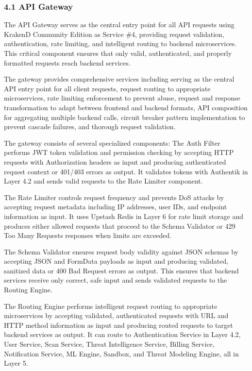\documentclass[12pt,a4paper]{report}
\begin{document}
\subsubsection{4.1 API Gateway}

The API Gateway serves as the central entry point for all API requests using KrakenD Community Edition as Service \#4, providing request validation, authentication, rate limiting, and intelligent routing to backend microservices. This critical component ensures that only valid, authenticated, and properly formatted requests reach backend services.

The gateway provides comprehensive services including serving as the central API entry point for all client requests, request routing to appropriate microservices, rate limiting enforcement to prevent abuse, request and response transformation to adapt between frontend and backend formats, API composition for aggregating multiple backend calls, circuit breaker pattern implementation to prevent cascade failures, and thorough request validation.

The gateway consists of several specialized components: The Auth Filter performs JWT token validation and permission checking by accepting HTTP requests with Authorization headers as input and producing authenticated request context or 401/403 errors as output. It validates tokens with Authentik in Layer 4.2 and sends valid requests to the Rate Limiter component.

The Rate Limiter controls request frequency and prevents DoS attacks by accepting request metadata including IP addresses, user IDs, and endpoint information as input. It uses Upstash Redis in Layer 6 for rate limit storage and produces either allowed requests that proceed to the Schema Validator or 429 Too Many Requests responses when limits are exceeded.

The Schema Validator ensures request body validity against JSON schemas by accepting JSON and FormData payloads as input and producing validated, sanitized data or 400 Bad Request errors as output. This ensures that backend services receive only correct, safe input and sends validated requests to the Routing Engine.

The Routing Engine performs intelligent request routing to appropriate microservices by accepting validated, authenticated requests with URL and HTTP method information as input and producing routed requests to target backend services as output. It can route to Authentication Service in Layer 4.2, User Service, Scan Service, Threat Intelligence Service, Billing Service, Notification Service, ML Engine, Sandbox, and Threat Modeling Engine, all in Layer 5.
\end{document}
